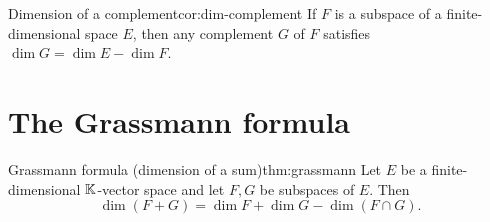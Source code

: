 \begin{corollary}{Dimension of a complement}{cor:dim-complement}
If $F$ is a subspace of a finite-dimensional space $E$, then any
complement $G$ of $F$ satisfies $\dim G = \dim E - \dim F$.
\end{corollary}


\section{The Grassmann formula}\label{sec:grassmann}

\begin{theorem}{Grassmann formula (dimension of a sum)}{thm:grassmann}
Let $E$ be a finite-dimensional ${\mathbb{K}}$-vector space and let $F,G$ be
subspaces of $E$. Then
\[
  \dim(F+G) = \dim F + \dim G - \dim(F\cap G).
\]
\end{theorem}

